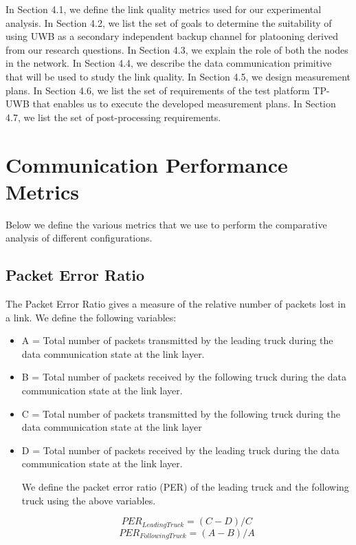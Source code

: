 
In Section 4.1, we define the link quality metrics used for our experimental analysis.
In Section 4.2, we list the set of goals to determine the suitability of using UWB as a secondary independent backup channel for platooning derived from our research questions. In Section 4.3, we explain the role of both the nodes in the network. In Section 4.4, we describe the data communication primitive that will be used to study the link quality. In Section 4.5, we design measurement plans. In Section 4.6, we list the set of requirements of the test platform TP-UWB that enables us to execute the developed measurement plans. In Section 4.7, we list the set of post-processing requirements.

\section{Communication Performance Metrics}
Below we define the various metrics that we use to perform the comparative analysis of different configurations.

\subsection{Packet Error Ratio}
The Packet Error Ratio gives a measure of the relative number of packets lost in a link. We define the following variables:
\begin{itemize}
    \item A = Total number of packets transmitted by the leading truck during the data communication state at the link layer.
    \item B = Total number of packets received by the following truck during the data communication state at the link layer.
    \item C = Total number of packets transmitted by the following truck during the data communication state at the link layer
    \item D = Total number of packets received by the leading truck during the data communication state at the link layer.
    
    We define the packet error ratio (PER) of the leading truck and the following truck using the above variables.
    
    \begin{equation}
    PER_{LeadingTruck} = (C-D)/C
    \label{eq: PERLeadingTruck}
    \end{equation}
    \begin{equation}
    PER_{FollowingTruck} = (A-B)/A
    \label{eq: PERFollowingTruck}
    \end{equation}
    
\end{itemize}


